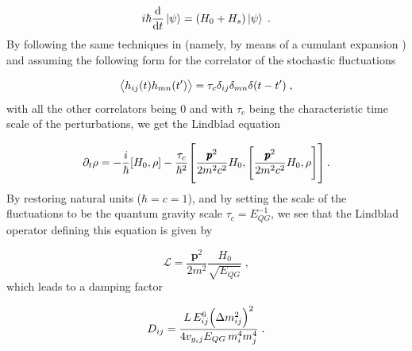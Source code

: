 \documentclass[11pt]{article}
\begin{document}
\begin{equation}
     i\hbar \dv{}{t}\ket{\psi} = \qty(H_0+H_s)\ket{\psi}\;.
\end{equation}
By following the same techniques in \cite{Petruzziello:2020wkd} (namely, by means of a cumulant expansion \cite{VANKAMPEN1974215}) and assuming the following form for the correlator of the stochastic fluctuations \cite{Breuer:2008rh}

\begin{equation}
    \expval{h_{ij}(t)h_{mn}(t^\prime)} = \tau_c \delta_{ij}\delta_{mn}\delta(t-t^\prime)\;,
\end{equation}
with all the other correlators being $0$ and with $\tau_c$ being the characteristic time scale of the perturbations, we get the Lindblad equation

\begin{equation}
    \partial_t \rho = -\frac{i}{\hbar}\comm{H_0}{\rho} - \frac{\tau_c}{\hbar^2}\comm{\frac{\pmb{p}^2}{2m^2c^2}H_0}{\comm{\frac{\pmb{p}^2}{2m^2c^2}H_0}{\rho}}\,.
\end{equation}
By restoring natural units ($\hbar=c=1$), and by setting the scale of the fluctuations to be the quantum gravity scale $\tau_c= E_{QG}^{-1}$, we see that the Lindblad operator defining this equation is given by

\begin{equation}\label{lindblad relativistic model}
    \mathcal{L} = \frac{\pmb{p}^2}{2m^2}\frac{H_0}{\sqrt{E_{QG}}}\;,
\end{equation}
which leads to a damping factor

\begin{equation}
    D_{ij} = \frac{L\,E_{ij}^6 \qty(\Delta m^2_{ij})^2}{4v_{g_ij}E_{QG}\,m_i^4m_j^4}\;.
\end{equation}


\newpage
\end{document}
